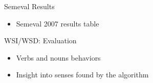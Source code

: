 \documentclass[10pt,xcolor=table]{beamer}
\begin{document}
\begin{frame}{Semeval Results}
\begin{itemize}
\item Semeval 2007 results table
\end{itemize}
\end{frame}






\begin{frame}{WSI/WSD: Evaluation}
\begin{itemize}
\item Verbs and nouns behaviors
\item Insight into senses found by the algorithm
\end{itemize}
\end{frame}
%
%
%
%
%





%
%
\end{document}
